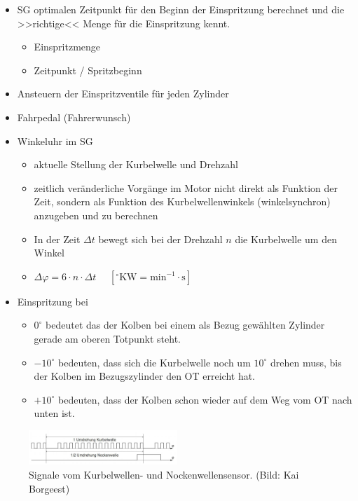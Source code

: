 \begin{itemize}
\item
  SG optimalen Zeitpunkt für den Beginn der Einspritzung berechnet und
  die >>richtige<< Menge für die Einspritzung kennt.

  \begin{itemize}
  \item
    Einspritzmenge
  \item
    Zeitpunkt / Spritzbeginn
  \end{itemize}
\item
  Ansteuern der Einspritzventile für jeden Zylinder
\item
  Fahrpedal (Fahrerwunsch)
\item
  Winkeluhr im SG

  \begin{itemize}
  \item
    aktuelle Stellung der Kurbelwelle und Drehzahl
  \item
    zeitlich veränderliche Vorgänge im Motor nicht direkt als Funktion
    der Zeit, sondern als Funktion des Kurbelwellenwinkels
    (winkelsynchron) anzugeben und zu berechnen
  \item
    In der Zeit $\Delta t$ bewegt sich bei der Drehzahl $n$ die
    Kurbelwelle um den Winkel
  \item
    $\Delta \varphi = 6 \cdot n \cdot \Delta t$
    $\quad [^\circ \text{KW} = \text{min}^{-1} \cdot \text{s}]$
  \end{itemize}
\item
  Einspritzung bei

  \begin{itemize}
  \item
    $0^\circ$ bedeutet das der Kolben bei einem als Bezug gewählten
    Zylinder gerade am oberen Totpunkt steht.
  \item
    $-10^\circ$ bedeuten, dass sich die Kurbelwelle noch um
    $10^\circ$ drehen muss, bis der Kolben im Bezugszylinder den OT
    erreicht hat.
  \item
    $+10^\circ$ bedeuten, dass der Kolben schon wieder auf dem Weg vom
    OT nach unten ist.
  \end{itemize}
\end{itemize}

\newpage

\begin{figure}[!ht]%
\centering
\includegraphics[width=0.5\textwidth]{images/EDC/EDC-3.pdf}
\caption{Signale vom Kurbelwellen- und Nockenwellensensor. (Bild: Kai
Borgeest)}
\end{figure}

